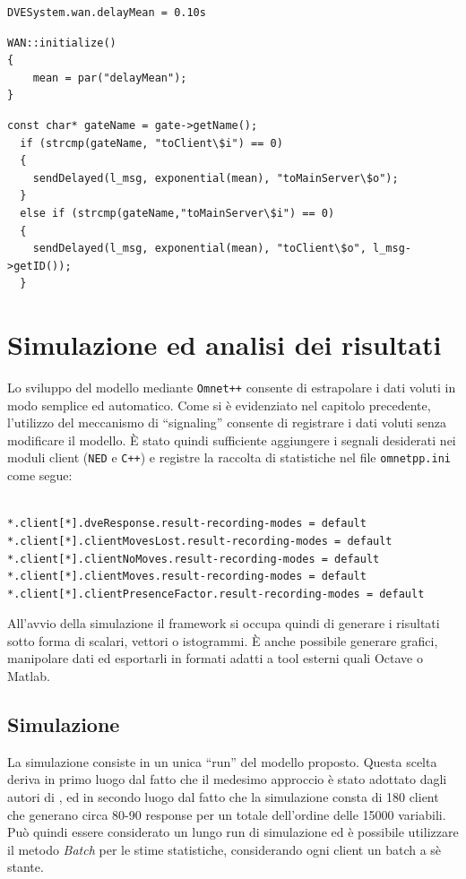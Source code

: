\documentclass[a4paper, 11pt, oneside]{book}
\theoremstyle{definition}
\theoremstyle{remark}
\begin{document}
\begin{lstlisting}[title = {\texttt{omnetpp.ini}: definizione della media},
                  ]
DVESystem.wan.delayMean = 0.10s
\end{lstlisting}

\begin{lstlisting}[title = {\texttt{WAN.cc}: inizializzazione della media},
                  ]
WAN::initialize()
{
    mean = par("delayMean");
}
\end{lstlisting}

\begin{lstlisting}[title = {\texttt{WAN.cc}: tipico meccanismo di routing},
                  ]
  const char* gateName = gate->getName();
  if (strcmp(gateName, "toClient\$i") == 0)
  {
    sendDelayed(l_msg, exponential(mean), "toMainServer\$o");
  }
  else if (strcmp(gateName,"toMainServer\$i") == 0)
  {
    sendDelayed(l_msg, exponential(mean), "toClient\$o", l_msg->getID());
  }
\end{lstlisting}

\chapter{Simulazione ed analisi dei risultati}\label{analisi}
Lo sviluppo del modello mediante \texttt{Omnet++} consente di estrapolare
i dati voluti in modo semplice ed automatico. Come si è evidenziato nel
capitolo precedente, l'utilizzo del meccanismo di ``signaling'' consente di
registrare i dati voluti senza modificare il modello. \`E stato quindi
sufficiente aggiungere i segnali desiderati nei moduli client (\texttt{NED} e
\texttt{C++}) e registre la raccolta di statistiche nel file
\texttt{omnetpp.ini} come segue:
\begin{lstlisting}

*.client[*].dveResponse.result-recording-modes = default
*.client[*].clientMovesLost.result-recording-modes = default
*.client[*].clientNoMoves.result-recording-modes = default
*.client[*].clientMoves.result-recording-modes = default
*.client[*].clientPresenceFactor.result-recording-modes = default
\end{lstlisting}

All'avvio della simulazione il framework si occupa quindi di generare i
risultati sotto forma di scalari, vettori o istogrammi. \`E anche possibile
generare grafici, manipolare dati ed esportarli in formati adatti a tool
esterni quali Octave o Matlab.

\section{Simulazione}
La simulazione consiste in un unica ``run'' del modello proposto. Questa
scelta deriva in primo luogo dal fatto che il medesimo approccio è stato
adottato dagli autori di \cite{IDVE}, ed in secondo luogo dal fatto che
la simulazione consta di 180 client che generano circa 80-90 response per
un totale dell'ordine delle 15000 variabili. Può quindi essere considerato
un lungo run di simulazione ed è possibile utilizzare il metodo \emph{Batch}
per le stime statistiche, considerando ogni client un batch a sè stante.
\end{document}
